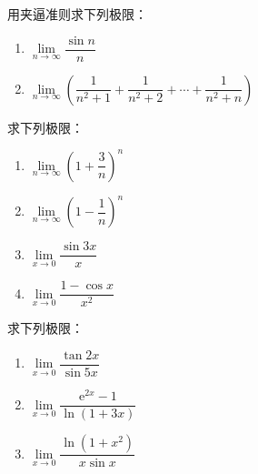 \documentclass[fontset=fandol]{ctexart}
\newcommand{\ee}{\mathrm{e}}
\begin{document}
\begin{exercise}用夹逼准则求下列极限：

\begin{enumerate}

\item \(\lim\limits_{n\to\infty} \dfrac{\sin n}{n}\)

\item \(\lim\limits_{n\to\infty} \left(\dfrac{1}{n^2+1} + \dfrac{1}{n^2+2} + \cdots + \dfrac{1}{n^2+n}\right)\)

\end{enumerate}

\end{exercise}



\begin{exercise}求下列极限：

\begin{enumerate}

\item \(\lim\limits_{n\to\infty} \left(1 + \dfrac{3}{n}\right)^n\)

\item \(\lim\limits_{n\to\infty} \left(1 - \dfrac{1}{n}\right)^n\)

\item \(\lim\limits_{x\to 0} \dfrac{\sin 3x}{x}\)

\item \(\lim\limits_{x\to 0} \dfrac{1 - \cos x}{x^2}\)

\end{enumerate}

\end{exercise}



\begin{exercise}求下列极限：

\begin{enumerate}

\item \(\lim\limits_{x\to 0} \dfrac{\tan 2x}{\sin 5x}\)

\item \(\lim\limits_{x\to 0} \dfrac{\ee^{2x} - 1}{\ln(1+3x)}\)

\item \(\lim\limits_{x\to 0} \dfrac{\ln(1 + x^2)}{x \sin x}\)

\end{enumerate}

\end{exercise}
\end{document}
